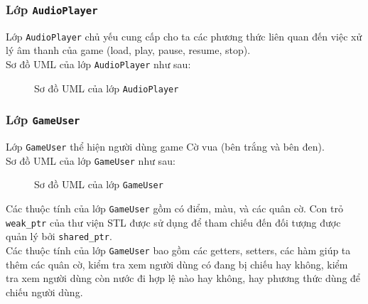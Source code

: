 \subsubsection{Lớp \lstinline{AudioPlayer}}
Lớp \lstinline{AudioPlayer} chủ yếu cung cấp cho ta các phương thức liên quan đến việc xử lý âm thanh của game (load, play, pause, resume, stop).\\
Sơ đồ UML của lớp \lstinline{AudioPlayer} như sau:
\begin{figure}[H]
\caption{Sơ đồ UML của lớp \lstinline{AudioPlayer}}
\end{figure}

\subsubsection{Lớp \lstinline{GameUser}}
Lớp \lstinline{GameUser} thể hiện người dùng game Cờ vua (bên trắng và bên đen).\\
Sơ đồ UML của lớp \lstinline{GameUser} như sau:
\begin{figure}[H]
\caption{Sơ đồ UML của lớp \lstinline{GameUser}}
\end{figure}
Các thuộc tính của lớp \lstinline{GameUser} gồm có điểm, màu, và các quân cờ. Con trỏ \lstinline{weak_ptr} của thư viện STL được sử dụng để tham chiếu đến đối tượng được quản lý bởi \lstinline{shared_ptr}.\\
Các thuộc tính của lớp \lstinline{GameUser} bao gồm các getters, setters, các hàm giúp ta thêm các quân cờ, kiểm tra xem người dùng có đang bị chiếu hay không, kiểm tra xem người dùng còn nước đi hợp lệ nào hay không, hay phương thức dùng để chiếu người dùng.

